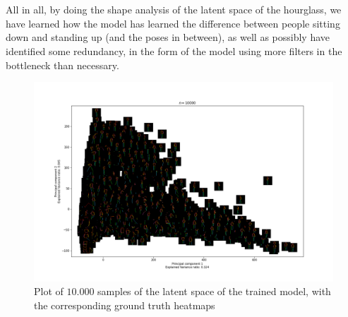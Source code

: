 \documentclass[./main.tex]{subfiles}
\begin{document}
\\
\\
All in all, by doing the shape analysis of the latent space of the hourglass, we have learned how the model has learned the difference between people sitting down and standing up (and the poses in between), as well as possibly have identified some redundancy, in the form of the model using more filters in the bottleneck than necessary.
\begin{figure}[htbp]
    \centering
    \includegraphics[width = \textwidth]{entities/latent_space_all_skeletons.png}
    \caption{Plot of $10.000$ samples of the latent space of the trained model, with the corresponding ground truth heatmaps}
    \label{fig:latent_space_all_skeletons}
\end{figure}
\end{document}
